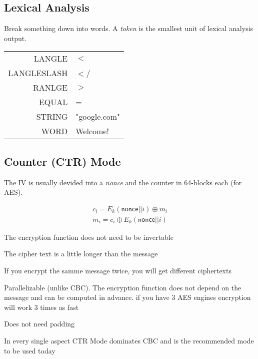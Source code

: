 \documentclass[12pt]{article}
\begin{document}
\subsection{Lexical Analysis}

Break something down into words. A \emph{token} is the smallest unit of lexical analysis output.

\begin{tabular}{r | l}
	LANGLE & $<$ \\
	LANGLESLASH & $<$\slash \\
	RANLGE & $>$ \\
	EQUAL & = \\
	STRING & "google.com" \\
	WORD & Welcome!
\end{tabular}



\subsection*{Counter (CTR) Mode}

The IV is usually devided into a \emph{nonce} and the counter in 64-blocks each (for AES).

\begin{equation}
\begin{split}
c_i = E_k(\textsf{nonce}||i) \oplus m_i \\
m_i = c_i \oplus E_k(\textsf{nonce}||i)
\end{split}
\end{equation}

\begin{list}{*}{
\setlength{\itemsep}{0pt}
\setlength{\parsep}{0pt}
\setlength{\topsep}{0pt}
\setlength{\partopsep}{0pt}
\setlength{\leftmargin}{2em}
\setlength{\labelwidth}{1.5em}
\setlength{\labelsep}{0.5em}
}
\item The encryption function does not need to be invertable
\item The cipher text is a little longer than the message
\item If you encrypt the samme message twice, you will get different ciphertexts
\item Parallelizable (unlike CBC). The encryption function does not depend on the message and can be computed in advance. if you have 3 AES engines encryption will work 3 times as fast
\item Does not need padding
\item In every single aspect CTR Mode dominates CBC and is the recommended mode to be used today
\end{list}
\end{document}

